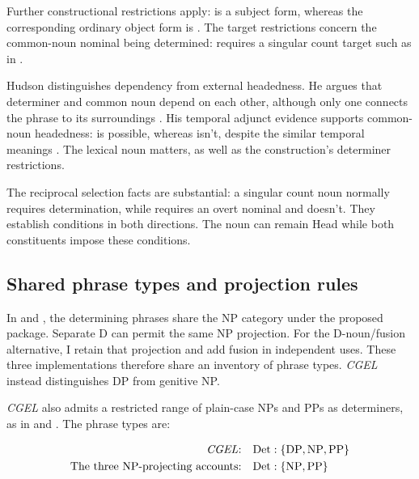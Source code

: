 \documentclass[12pt]{article}
\begin{document}
Further constructional restrictions apply:  is a subject form, whereas the corresponding ordinary object form is . The target restrictions concern the common-noun nominal being determined:  requires a singular count target such as  in .

Hudson distinguishes dependency from external headedness. He argues that determiner and common noun depend on each other, although only one connects the phrase to its surroundings \citep[7--8]{hudson2004determiners}. His temporal adjunct evidence supports common-noun headedness:  is possible, whereas  isn't, despite the similar temporal meanings \citep[10--12]{hudson2004determiners}. The lexical noun matters, as well as the construction's determiner restrictions.

The reciprocal selection facts are substantial: a singular count noun normally requires determination, while  requires an overt nominal and  doesn't. They establish conditions in both directions. The noun can remain Head while both constituents impose these conditions.

\subsection{Shared phrase types and projection rules}\label{sec:det-uniform}

In  and , the determining phrases share the NP category under the proposed package. Separate D can permit the same NP projection. For the D-noun/fusion alternative, I retain that projection and add fusion in independent uses. These three implementations therefore share an inventory of phrase types. \textit{CGEL} instead distinguishes DP from genitive NP.

\textit{CGEL} also admits a restricted range of plain-case NPs and PPs as determiners, as in  and  \citep[Ch.~5, §4]{huddleston2002}. The phrase types are:

\[
\begin{aligned}
\text{\textit{CGEL}:} &\quad \mathrm{Det}:\{\mathrm{DP},\mathrm{NP},\mathrm{PP}\} \\
\text{The three NP-projecting accounts:} &\quad \mathrm{Det}:\{\mathrm{NP},\mathrm{PP}\}
\end{aligned}
\]
\end{document}
